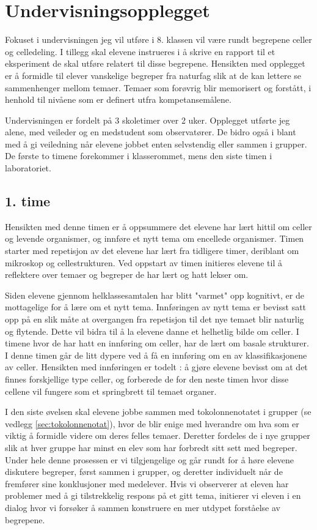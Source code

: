 \documentclass[main.tex]{subfiles}
\begin{document}
\section*{Undervisningsopplegget}
\label{sec:1}
Fokuset i undervisningen jeg vil utføre i 8. klassen vil være rundt begrepene celler og celledeling. 
I tillegg skal elevene instrueres i å skrive en rapport til et eksperiment de skal utføre relatert til disse begrepene.
Hensikten med opplegget er å formidle til elever vanskelige begreper fra naturfag slik at de kan lettere 
se sammenhenger mellom temaer. Temaer som forøvrig blir memorisert og forstått, i henhold til nivåene 
som er definert utfra kompetansemålene. 

Undervisningen er fordelt på 3 skoletimer over 2 uker. Opplegget utførte jeg alene, med veileder og en 
medstudent som observatører. De bidro også i blant med å gi veiledning når elevene jobbet enten 
selvstendig eller sammen i grupper. De første to timene forekommer i klasserommet, mens den siste timen 
i laboratoriet.

\subsection*{1. time}

Hensikten med denne timen er å oppsummere det elevene har lært hittil om celler og 
levende organismer, og innføre et nytt tema om encellede organismer. Timen starter med repetisjon 
av det elevene har lært fra tidligere timer, deriblant om mikroskop og cellestrukturen. Ved oppstart 
av timen initieres elevene til å reflektere over temaer og begreper de har lært og hatt lekser 
om.
 
Siden elevene gjennom helklassesamtalen har blitt "varmet" opp kognitivt, er de mottagelige for å 
lære om et nytt tema. Innføringen av nytt tema er bevisst satt opp på en slik måte at overgangen 
fra repetisjon til det nye temaet blir naturlig og flytende. Dette vil bidra til å la elevene danne et 
helhetlig bilde om celler. I timene hvor de har hatt en innføring om celler, har de lært om basale 
strukturer. I denne timen går de litt dypere ved å få en innføring om en av klassifikasjonene av celler.
Hensikten med innføringen er todelt : å gjøre elevene bevisst om at det finnes forskjellige type
celler, og forberede de for den neste timen hvor disse cellene vil fungere som et springbrett til temaet organer.
 
I den siste øvelsen skal elevene jobbe sammen med tokolonnenotatet i grupper (se 
vedlegg \ref{sec:tokolonnenotat}), hvor de blir enige med hverandre om hva som er viktig å formidle videre 
om deres felles temaer. Deretter fordeles de i nye grupper slik at hver gruppe har minst en elev som har 
forbredt sitt sett med begreper. Under hele denne prosessen er vi tilgjengelige og går rundt for å 
høre elevene diskutere begreper, først sammen i grupper, og deretter individuelt når de fremfører sine 
konklusjoner med medelever. Hvis vi observerer at eleven har problemer med å gi tilstrekkelig 
respons på et gitt tema, initierer vi eleven i en dialog hvor vi forsøker å sammen konstruere en 
mer utdypet forståelse av begrepene. 
\end{document}
